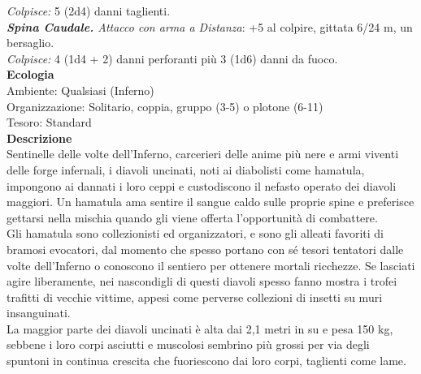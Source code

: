 \begin{multicols}{2}
\emph{Colpisce:} 5 (2d4) danni taglienti.\\
\emph{\textbf{Spina Caudale.} Attacco con arma a Distanza}: +5 al colpire, gittata 6/24 m, un bersaglio.\\
\emph{Colpisce:} 4 (1d4 + 2) danni perforanti più 3 (1d6) danni da fuoco.\\
\textbf{Ecologia}\\
Ambiente: Qualsiasi (Inferno)\\
Organizzazione: Solitario, coppia, gruppo (3-5) o plotone (6-11)\\
Tesoro: Standard\\
\textbf{Descrizione}\\
Sentinelle delle volte dell’Inferno, carcerieri delle anime più nere e armi viventi delle forge infernali, i diavoli uncinati, noti ai diabolisti come hamatula, impongono ai dannati i loro ceppi e custodiscono il nefasto operato dei diavoli maggiori. Un hamatula ama sentire il sangue caldo sulle proprie spine e preferisce gettarsi nella mischia quando gli viene offerta l’opportunità di combattere.\\
Gli hamatula sono collezionisti ed organizzatori, e sono gli alleati favoriti di bramosi evocatori, dal momento che spesso portano con sé tesori tentatori dalle volte dell’Inferno o conoscono il sentiero per ottenere mortali ricchezze. Se lasciati agire liberamente, nei nascondigli di questi diavoli spesso fanno mostra i trofei trafitti di vecchie vittime, appesi come perverse collezioni di insetti su muri insanguinati.\\
La maggior parte dei diavoli uncinati è alta dai 2,1 metri in su e pesa 150 kg, sebbene i loro corpi asciutti e muscolosi sembrino più grossi per via degli spuntoni in continua crescita che fuoriescono dai loro corpi, taglienti come lame.\\


\end{multicols}
